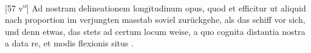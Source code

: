[57 v\textsuperscript{o}]   Ad nostram delineationem longitudinum\protect{} opus, quod et efficitur ut aliquid nach proportion im verjungten masstab soviel zur\"{u}ckgehe, als das schiff\protect{} vor sich, und denn etwas, das stets ad certum locum weise, a quo cognita distantia nostra a data re, et modis flexionis situs . \pend \pstart {} \pend 